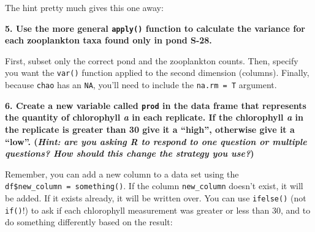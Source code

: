 \documentclass[]{book}
\newenvironment{Shaded}{\begin{snugshade}}{\end{snugshade}}
\newcommand{\KeywordTok}[1]{\textcolor[rgb]{0.13,0.29,0.53}{\textbf{#1}}}
\newcommand{\DataTypeTok}[1]{\textcolor[rgb]{0.13,0.29,0.53}{#1}}
\newcommand{\DecValTok}[1]{\textcolor[rgb]{0.00,0.00,0.81}{#1}}
\newcommand{\StringTok}[1]{\textcolor[rgb]{0.31,0.60,0.02}{#1}}
\newcommand{\OperatorTok}[1]{\textcolor[rgb]{0.81,0.36,0.00}{\textbf{#1}}}
\newcommand{\NormalTok}[1]{#1}
\theoremstyle{definition}
\theoremstyle{definition}
\theoremstyle{definition}
\theoremstyle{remark}
\begin{document}
The hint pretty much gives this one away:

\begin{Shaded}
\end{Shaded}

\textbf{5. Use the more general \texttt{apply()} function to calculate
the variance for each zooplankton taxa found only in pond S-28.}

First, subset only the correct pond and the zooplankton counts. Then,
specify you want the \texttt{var()} function applied to the second
dimension (columns). Finally, because \texttt{chao} has an \texttt{NA},
you'll need to include the \texttt{na.rm\ =\ T} argument.

\begin{Shaded}
\end{Shaded}

\textbf{6. Create a new variable called \texttt{prod} in the data frame
that represents the quantity of chlorophyll \emph{a} in each replicate.
If the chlorophyll \emph{a} in the replicate is greater than 30 give it
a ``high'', otherwise give it a ``low''. (\emph{Hint: are you asking R
to respond to one question or multiple questions? How should this change
the strategy you use?})}

Remember, you can add a new column to a data set using the
\texttt{df\$new\_column\ =\ something()}. If the column
\texttt{new\_column} doesn't exist, it will be added. If it exists
already, it will be written over. You can use \texttt{ifelse()} (not
\texttt{if()}!) to ask if each chlorophyll measurement was greater or
less than 30, and to do something differently based on the result:

\begin{Shaded}
\end{Shaded}
\end{document}
